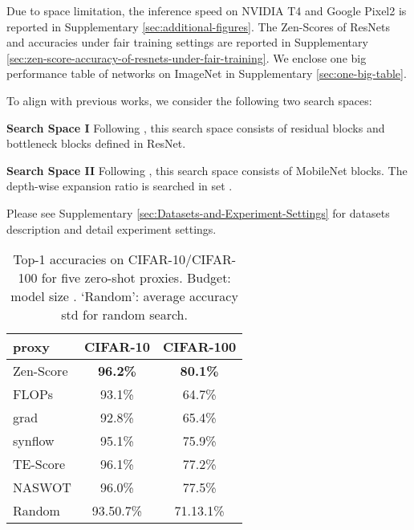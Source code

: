 \documentclass{article}
\providecommand{\tabularnewline}{\\}
\providecommand{\citep}{\cite}
\providecommand{\tabularnewline}{\\}
\begin{document}
Due to space limitation, the inference speed on NVIDIA T4 and Google Pixel2 is reported in Supplementary \ref{sec:additional-figures}. The Zen-Scores of ResNets and accuracies under fair training settings are reported in Supplementary \ref{sec:zen-score-accuracy-of-resnets-under-fair-training}. We enclose one big performance table of networks on ImageNet in Supplementary \ref{sec:one-big-table}.

To align with previous works, we consider the following two search spaces:
\begin{compactitem}
 \item \textbf{Search Space I} Following \citep{heDeepResidualLearning2016,radosavovicDesigningNetworkDesign2020}, this search space consists of residual blocks and bottleneck blocks defined in ResNet.
 \item \textbf{Search Space II} Following \citep{sandlerMobileNetV2InvertedResiduals2018,phamEfficientNeuralArchitecture2018a}, this search space consists of MobileNet blocks. The depth-wise expansion ratio is searched in set .
\end{compactitem}
Please see Supplementary \ref{sec:Datasets-and-Experiment-Settings} for datasets description and detail experiment settings. 



\begin{table}[!]
 \begin{center}
 \begin{tabular}{lcc}
     \toprule 
     proxy & CIFAR-10 & CIFAR-100\tabularnewline
     \midrule
     \midrule 
     Zen-Score & \textbf{96.2\%} & \textbf{80.1\%} \tabularnewline
     \midrule 
     FLOPs & 93.1\% & 64.7\%\tabularnewline
     \midrule 
     grad & 92.8\% & 65.4\%\tabularnewline
     \midrule 
     synflow & 95.1\% & 75.9\%\tabularnewline
     \midrule 
     TE-Score & 96.1\% & 77.2\%\tabularnewline
     \midrule
     NASWOT & 96.0\% & 77.5\%\tabularnewline
     \midrule 
     Random  & 93.50.7\% & 71.13.1\%\tabularnewline
     \bottomrule
     \end{tabular}
 \end{center}
 \caption{Top-1 accuracies on CIFAR-10/CIFAR-100 for five zero-shot proxies. Budget: model size . `Random': average accuracy  std for random search.}
 \label{tab:top1-acc-for-five-proxy}
\end{table}
\end{document}
